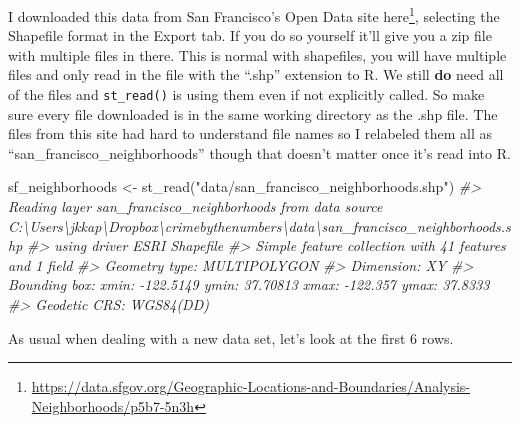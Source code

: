 \documentclass[
]{krantz}
\makeatletter
\newenvironment{Shaded}{\begin{snugshade}}{\end{snugshade}}
\newcommand{\CommentTok}[1]{\textcolor[rgb]{0.37,0.37,0.37}{\textit{#1}}}
\newcommand{\FunctionTok}[1]{\textcolor[rgb]{0,0,0}{#1}}
\newcommand{\NormalTok}[1]{#1}
\newcommand{\OtherTok}[1]{\textcolor[rgb]{0.37,0.37,0.37}{#1}}
\newcommand{\StringTok}[1]{\textcolor[rgb]{0.5,0.5,0.5}{#1}}
\renewcommand{\href}[2]{#2\footnote{\url{#1}}}
\newenvironment{kframe}{%
\medskip{}
\setlength{\fboxsep}{.8em}
 \def\at@end@of@kframe{}%
 \ifinner\ifhmode%
  \def\at@end@of@kframe{\end{minipage}}%
  \begin{minipage}{\columnwidth}%
 \fi\fi%
 \def\FrameCommand##1{\hskip\@totalleftmargin \hskip-\fboxsep
 \colorbox{shadecolor}{##1}\hskip-\fboxsep
     \hskip-\linewidth \hskip-\@totalleftmargin \hskip\columnwidth}%
 \MakeFramed {\advance\hsize-\width
   \@totalleftmargin\z@ \linewidth\hsize
   \@setminipage}}%
 {\par\unskip\endMakeFramed%
 \at@end@of@kframe}
\renewenvironment{Shaded}{\begin{kframe}}{\end{kframe}}
\makeatother
\begin{document}
I downloaded this data from San Francisco's Open Data site \href{https://data.sfgov.org/Geographic-Locations-and-Boundaries/Analysis-Neighborhoods/p5b7-5n3h}{here}, selecting the Shapefile format in the Export tab. If you do so yourself it'll give you a zip file with multiple files in there. This is normal with shapefiles, you will have multiple files and only read in the file with the ``.shp'' extension to R. We still \textbf{do} need all of the files and \texttt{st\_read()} is using them even if not explicitly called. So make sure every file downloaded is in the same working directory as the .shp file. The files from this site had hard to understand file names so I relabeled them all as ``san\_francisco\_neighborhoods'' though that doesn't matter once it's read into R.

\begin{Shaded}
\begin{Highlighting}[]
\NormalTok{sf\_neighborhoods }\OtherTok{\textless{}{-}} \FunctionTok{st\_read}\NormalTok{(}\StringTok{"data/san\_francisco\_neighborhoods.shp"}\NormalTok{)}
\CommentTok{\#\textgreater{} Reading layer \textasciigrave{}san\_francisco\_neighborhoods\textquotesingle{} from data source \textasciigrave{}C:\textbackslash{}Users\textbackslash{}jkkap\textbackslash{}Dropbox\textbackslash{}crimebythenumbers\textbackslash{}data\textbackslash{}san\_francisco\_neighborhoods.shp\textquotesingle{} }
\CommentTok{\#\textgreater{}   using driver \textasciigrave{}ESRI Shapefile\textquotesingle{}}
\CommentTok{\#\textgreater{} Simple feature collection with 41 features and 1 field}
\CommentTok{\#\textgreater{} Geometry type: MULTIPOLYGON}
\CommentTok{\#\textgreater{} Dimension:     XY}
\CommentTok{\#\textgreater{} Bounding box:  xmin: {-}122.5149 ymin: 37.70813 xmax: {-}122.357 ymax: 37.8333}
\CommentTok{\#\textgreater{} Geodetic CRS:  WGS84(DD)}
\end{Highlighting}
\end{Shaded}

As usual when dealing with a new data set, let's look at the first 6 rows.
\end{document}

